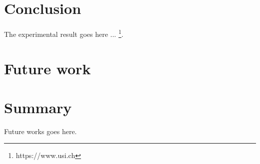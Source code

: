 \documentclass[a4paper]{usiinfbachelorproject}
\begin{document}
\section{\textbf{Conclusion}}
The experimental result goes here ... \footnote{https://www.usi.ch}. \\







\newpage
\section{\textbf{Future work}}

\section{\textbf{Summary}}
Future works goes here.






\newpage



\end{document}
